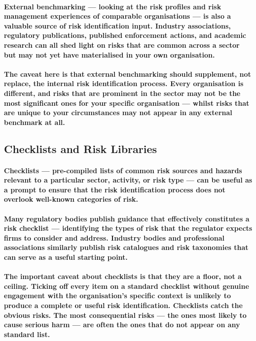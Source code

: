 \paragraph{\textbf{External benchmarking} — looking at the risk profiles and risk management experiences of comparable organisations — is also a valuable source of risk identification input. Industry associations, regulatory publications, published enforcement actions, and academic research can all shed light on risks that are common across a sector but may not yet have materialised in your own organisation.}
\paragraph{The caveat here is that external benchmarking should supplement, not replace, the internal risk identification process. Every organisation is different, and risks that are prominent in the sector may not be the most significant ones for your specific organisation — whilst risks that are unique to your circumstances may not appear in any external benchmark at all.}

\subsection{Checklists and Risk Libraries}
\paragraph{\textbf{Checklists} — pre-compiled lists of common risk sources and hazards relevant to a particular sector, activity, or risk type — can be useful as a prompt to ensure that the risk identification process does not overlook well-known categories of risk.}
\paragraph{Many regulatory bodies publish guidance that effectively constitutes a risk checklist — identifying the types of risk that the regulator expects firms to consider and address. Industry bodies and professional associations similarly publish risk catalogues and risk taxonomies that can serve as a useful starting point.}
\paragraph{The important caveat about checklists is that they are a floor, not a ceiling. Ticking off every item on a standard checklist without genuine engagement with the organisation's specific context is unlikely to produce a complete or useful risk identification. Checklists catch the obvious risks. The most consequential risks — the ones most likely to cause serious harm — are often the ones that do not appear on any standard list.}

